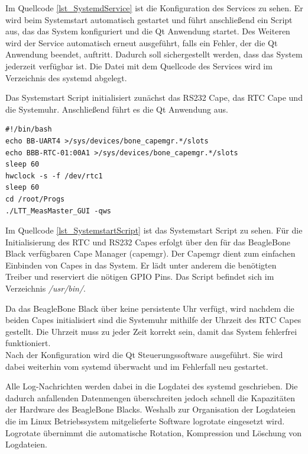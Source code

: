 Im Quellcode \ref{lst_SystemdService} ist die Konfiguration des Services zu sehen. Er wird beim Systemstart automatisch gestartet und führt anschließend ein Script aus, das das System konfiguriert und die Qt Anwendung startet. Des Weiteren wird der Service automatisch erneut ausgeführt, falls ein Fehler, der die Qt Anwendung beendet, auftritt. Dadurch soll sichergestellt werden, dass das System jederzeit verfügbar ist. Die Datei mit dem Quellcode des Services wird im Verzeichnis des systemd abgelegt.\ 

Das Systemstart Script initialisiert zunächst das RS232 Cape, das \ac{RTC} Cape und die Systemuhr. Anschließend führt es die Qt Anwendung aus.\\ 

\begin{lstlisting}[caption={Systemstart Script},label=lst_SystemstartScript]
#!/bin/bash
echo BB-UART4 >/sys/devices/bone_capemgr.*/slots
echo BBB-RTC-01:00A1 >/sys/devices/bone_capemgr.*/slots
sleep 60
hwclock -s -f /dev/rtc1
sleep 60
cd /root/Progs
./LTT_MeasMaster_GUI -qws
\end{lstlisting}

Im Quellcode \ref{lst_SystemstartScript} ist das Systemstart Script zu sehen. Für die Initialisierung des RTC und RS232 Capes erfolgt über den für das BeagleBone Black verfügbaren Cape Manager (capemgr). Der Capemgr \cite{Capemgr} dient zum einfachen Einbinden von Capes in das System. Er lädt unter anderem die benötigten Treiber und reserviert die nötigen \ac{GPIO} Pins. Das Script befindet sich im Verzeichnis \textit{/usr/bin/}.\ 

Da das BeagleBone Black über keine persistente Uhr verfügt, wird nachdem die beiden Capes initialisiert sind die Systemuhr mithilfe der Uhrzeit des RTC Capes gestellt. Die Uhrzeit muss zu jeder Zeit korrekt sein, damit das System fehlerfrei funktioniert.\\
Nach der Konfiguration wird die Qt Steuerungssoftware ausgeführt. Sie wird dabei weiterhin vom systemd überwacht und im Fehlerfall neu gestartet.\ 

Alle Log-Nachrichten werden dabei in die Logdatei des systemd geschrieben. Die dadurch anfallenden Datenmengen überschreiten jedoch schnell die Kapazitäten der Hardware des BeagleBone Blacks. Weshalb zur Organisation der Logdateien die im Linux Betriebssystem mitgelieferte Software logrotate \cite{logrotate} eingesetzt wird. Logrotate übernimmt die automatische Rotation, Kompression und Löschung von Logdateien.\\


